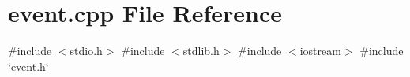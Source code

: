 \section{event.\+cpp File Reference}
\label{event_8cpp}
{\ttfamily \#include $<$stdio.\+h$>$}\newline
{\ttfamily \#include $<$stdlib.\+h$>$}\newline
{\ttfamily \#include $<$iostream$>$}\newline
{\ttfamily \#include \char`\"{}event.\+h\char`\"{}}\newline
